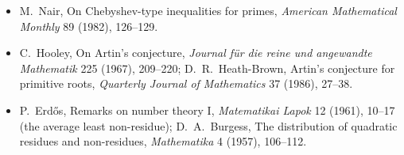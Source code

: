 \begin{itemize}
\item M.~Nair, On Chebyshev-type inequalities for primes, \emph{American Mathematical Monthly} 89 (1982), 126--129.
\item C.~Hooley, On Artin's conjecture, \emph{Journal für die reine und angewandte Mathematik} 225 (1967), 209--220; D.~R.~Heath-Brown,
Artin's conjecture for primitive roots, \emph{Quarterly Journal of Mathematics} 37 (1986), 27--38.
\item P.~Erdős, Remarks on number theory I, \emph{Matematikai Lapok} 12 (1961), 10--17 (the average least non-residue); D.~A.~Burgess, The
distribution of quadratic residues and non-residues, \emph{Mathematika} 4 (1957), 106--112.
\end{itemize}
